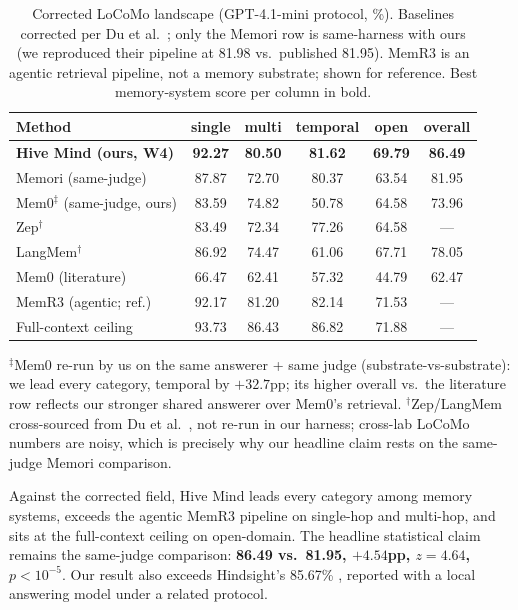 \documentclass[11pt]{article}
\newcommand{\system}{Hive Mind}
\newcommand{\best}[1]{\textbf{#1}}
\begin{document}
\begin{table}[t]
\centering
\small
\caption{Corrected LoCoMo landscape (GPT-4.1-mini protocol, \%).
Baselines corrected per Du et al.~\cite{memr3}; only the Memori row is
same-harness with ours (we reproduced their pipeline at 81.98 vs.\
published 81.95). MemR3 is an agentic retrieval pipeline, not a memory
substrate; shown for reference. Best memory-system score per column in
bold.}
\label{tab:field}
\begin{tabular}{lccccc}
\toprule
Method & single & multi & temporal & open & \textbf{overall}\\
\midrule
\textbf{\system{} (ours, W4)} & \best{92.27} & \best{80.50} & \best{81.62} & \best{69.79} & \best{86.49}\\
Memori \cite{memori} (same-judge) & 87.87 & 72.70 & 80.37 & 63.54 & 81.95\\
Mem0$^\ddagger$ (same-judge, ours) & 83.59 & 74.82 & 50.78 & 64.58 & 73.96\\
Zep$^\dagger$ \cite{zep} & 83.49 & 72.34 & 77.26 & 64.58 & ---\\
LangMem$^\dagger$ & 86.92 & 74.47 & 61.06 & 67.71 & 78.05\\
Mem0 \cite{mem0} (literature) & 66.47 & 62.41 & 57.32 & 44.79 & 62.47\\
\midrule
MemR3 (agentic; ref.) & 92.17 & 81.20 & 82.14 & 71.53 & ---\\
Full-context ceiling & 93.73 & 86.43 & 86.82 & 71.88 & ---\\
\bottomrule
\end{tabular}

\smallskip
\raggedright\footnotesize $^\ddagger$Mem0 re-run by us on the same
answerer + same judge (substrate-vs-substrate): we lead every category,
temporal by $+32.7$pp; its higher overall vs.\ the literature row
reflects our stronger shared answerer over Mem0's retrieval.
$^\dagger$Zep/LangMem cross-sourced from Du et
al.~\cite{memr3}, not re-run in our harness; cross-lab LoCoMo numbers
are noisy, which is precisely why our headline claim rests on the
same-judge Memori comparison.
\end{table}

Against the corrected field, \system{} leads every category among
memory systems, exceeds the agentic MemR3 pipeline on single-hop and
multi-hop, and sits at the full-context ceiling on open-domain. The
headline statistical claim remains the same-judge comparison:
\textbf{86.49 vs.\ 81.95, $+4.54$pp, $z{=}4.64$, $p{<}10^{-5}$}. Our
result also exceeds Hindsight's 85.67\% \cite{hindsight}, reported
with a local answering model under a related protocol.
\end{document}

